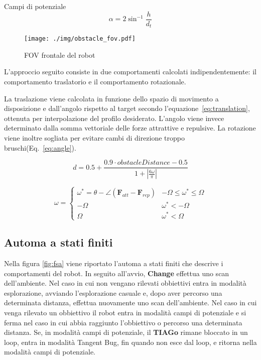 \documentclass[10pt]{beamer}
\begin{document}
\begin{frame}[allowframebreaks]{Campi di potenziale}
	\begin{equation}\label{eq:obstacle_fov}
		\alpha = {2}\sin^{-1}{\frac{h}{d_t}}
	\end{equation}

	\begin{figure}[H]
		\centering
		\texttt{[image: ./img/obstacle\_fov.pdf]}
		\caption{FOV frontale del robot}
		\label{fig:obstacle_fov}
	\end{figure}

	L'approccio seguito consiste in due comportamenti calcolati
	indipendentemente: il comportamento traslatorio e il comportamento
	rotazionale.

	La traslazione viene calcolata in funzione dello spazio di movimento a
	disposizione e dall'angolo rispetto al target secondo
	l'equazione~\ref{eq:translation}, ottenuta per interpolazione del profilo
	desiderato. L'angolo viene invece determinato dalla somma vettoriale delle
	forze attrattive e repulsive. La rotazione viene inoltre sogliata per
	evitare cambi di direzione troppo bruschi(Eq.~\ref{eq:angle}).

	\begin{equation}\label{eq:translation}
		d = 0.5 + \frac	{0.9\cdot obstacleDistance - 0.5}
		{1 + \left|
				\frac{6\omega}{\pi}
		\right|  } 
	\end{equation}
	
	\begin{equation}\label{eq:angle}
		\omega = \begin{cases}
			\omega^*=\theta - \angle\left( \textbf{F}_{att} - \textbf{F}_{rep} \right)  & -\Omega \le \omega^* \le \Omega \\
			-\Omega & \omega^* < -\Omega \\
			\Omega & \omega^* < \Omega

		\end{cases}	\end{equation}
	
	\subsection{Automa a stati finiti}\label{subsec:Pianificazione}
	
	Nella figura \ref{fig:fsa} viene riportato l'automa a stati finiti che
	descrive i comportamenti del robot. In seguito all'avvio, \textbf{Change}
	effettua uno scan dell'ambiente. Nel caso in cui non vengano rilevati
	obbiettivi entra in modalità esplorazione, avviando l'esplorazione casuale
	e, dopo aver percorso una determinata distanza, effettua nuovamente uno
	scan dell'ambiente. Nel caso in cui venga rilevato un obbiettivo il robot
	entra in modalità campi di potenziale e si ferma nel caso in cui abbia
	raggiunto l'obbiettivo o percorso una determinata distanza. Se, in modalità
	campi di potenziale, il \textbf{TIAGo} rimane bloccato in un loop, entra in
	modalità Tangent Bug, fin quando non esce dal loop, e ritorna nella
	modalità campi di potenziale.
	

\end{frame}
\end{document}
